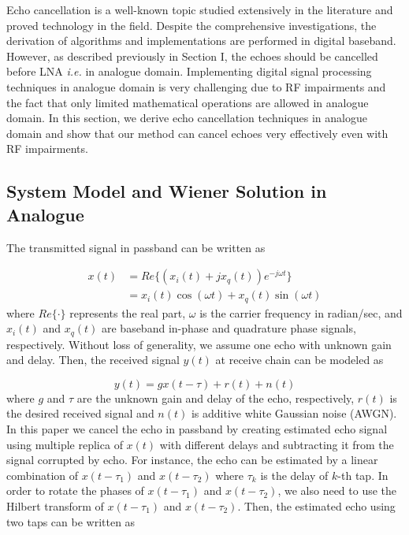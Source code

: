 \documentclass[twocolumn]{IEEEtran}
\begin{document}
Echo cancellation is a well-known topic studied extensively in the
literature and proved technology in the field. Despite the
comprehensive investigations, the derivation of algorithms and
implementations are performed in digital baseband. However, as
described previously in Section I, the echoes should be cancelled
before LNA \emph{i.e.} in analogue domain. Implementing digital
signal processing techniques in analogue domain is very challenging
due to RF impairments and the fact that only limited mathematical
operations are allowed in analogue domain. In this section, we
derive echo cancellation techniques in analogue domain and show that
our method can cancel echoes very effectively even with RF
impairments.


\subsection{System Model and Wiener Solution in Analogue}


The transmitted signal in passband can be written as

\begin{align}
x(t)&= Re\{ \left ( x_i(t) + j x_q(t) \right ) e^{-j\omega t}
\}  \\
    &= x_i(t) \cos (\omega t) + x_q (t) \sin (\omega t)
\end{align}
where $Re\{\cdot\}$ represents the real part, $\omega$ is the
carrier frequency in radian/sec, and $x_i (t)$ and $x_q (t)$ are
baseband in-phase and quadrature phase signals, respectively.
Without loss of generality, we assume one echo with unknown gain and
delay. Then, the received signal $y(t)$ at receive chain can be
modeled as

\begin{equation} \label{y-passband}
y(t)=g x(t-\tau)+r(t)+n(t)
\end{equation}
where $g$ and $\tau$ are the unknown gain and delay of the echo,
respectively, $r(t)$ is the desired received signal and $n(t)$ is
additive white Gaussian noise (AWGN). In this paper we cancel the
echo in passband by creating estimated echo signal using multiple
replica of $x(t)$ with different delays and subtracting it from the
signal corrupted by echo. For instance, the echo can be estimated by
a linear combination of $x(t-\tau_1)$ and $x(t-\tau_2)$ where
$\tau_k$ is the delay of $k$-th tap. In order to rotate the phases
of $x(t-\tau_1)$ and $x(t-\tau_2)$, we also need to use the Hilbert
transform of $x(t-\tau_1)$ and $x(t-\tau_2)$. Then, the estimated
echo using two taps can be written as
\end{document}
